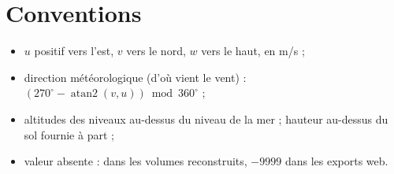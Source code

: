 \section{Conventions}
\begin{itemize}
  \item $u$ positif vers l'est, $v$ vers le nord, $w$ vers le haut, en m/s ;
  \item direction météorologique (d'où vient le vent) : $(270^\circ - \operatorname{atan2}(v, u))
        \bmod 360^\circ$ ;
  \item altitudes des niveaux au-dessus du niveau de la mer ; hauteur au-dessus du sol fournie à
        part ;
  \item valeur absente :  dans les volumes reconstruits, $-9999$ dans les exports web.
\end{itemize}
